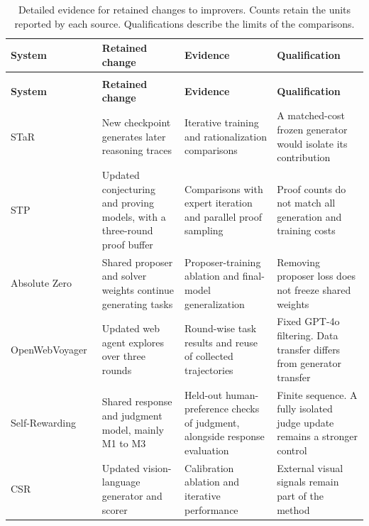 \begingroup
\small
\renewcommand{\arraystretch}{1.15}
\setlength{\tabcolsep}{4pt}
\begin{longtable}{@{}>{\raggedright\arraybackslash}p{}>{\raggedright\arraybackslash}p{}>{\raggedright\arraybackslash}p{}>{\raggedright\arraybackslash}p{}@{}}
\caption{Detailed evidence for retained changes to improvers. Counts retain the units reported by each source. Qualifications describe the limits of the comparisons.}\label{tab:full-evidence}\\
\toprule
\textbf{System} & \textbf{Retained change} & \textbf{Evidence} & \textbf{Qualification} \\
\midrule
\endfirsthead
\multicolumn{4}{l}{\tablename\ \thetable\ continued}\\
\toprule
\textbf{System} & \textbf{Retained change} & \textbf{Evidence} & \textbf{Qualification} \\
\midrule
\endhead
\bottomrule
\endfoot
STaR~\citep{zelikman2022star} & New checkpoint generates later reasoning traces & Iterative training and rationalization comparisons & A matched-cost frozen generator would isolate its contribution \\
\addlinespace[8pt]
STP~\citep{dong2025stp} & Updated conjecturing and proving models, with a three-round proof buffer & Comparisons with expert iteration and parallel proof sampling & Proof counts do not match all generation and training costs \\
\addlinespace[8pt]
Absolute Zero~\citep{zhao2025absolute} & Shared proposer and solver weights continue generating tasks & Proposer-training ablation and final-model generalization & Removing proposer loss does not freeze shared weights \\
\addlinespace[8pt]
OpenWeb\-Voyager~\citep{he-etal-2025-openwebvoyager} & Updated web agent explores over three rounds & Round-wise task results and reuse of collected trajectories & Fixed GPT-4o filtering. Data transfer differs from generator transfer \\
\addlinespace[8pt]
Self-Rewarding~\citep{pmlr-v235-yuan24d} & Shared response and judgment model, mainly M1 to M3 & Held-out human-preference checks of judgment, alongside response evaluation & Finite sequence. A fully isolated judge update remains a stronger control \\
\addlinespace[8pt]
CSR~\citep{zhou2024calibrated} & Updated vision-language generator and scorer & Calibration ablation and iterative performance & External visual signals remain part of the method \\

\end{longtable}
